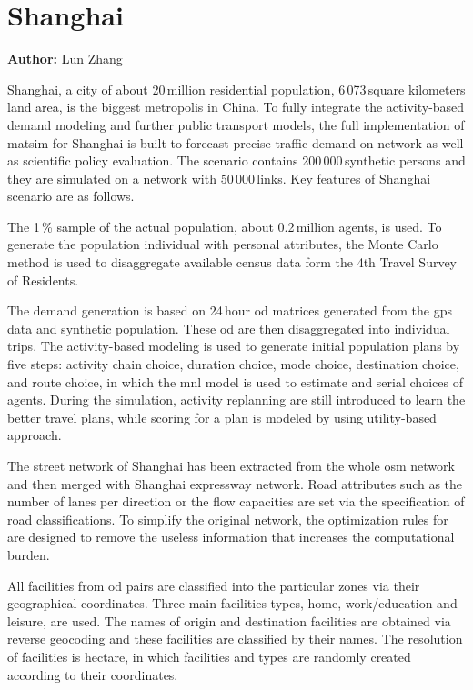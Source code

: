 \section{Shanghai}
\label{sec:shanghai}
\hfill \textbf{Author:} Lun Zhang

Shanghai, a city of about 20\,million residential population, 6\,073\,square kilometers land area, is the biggest metropolis in China. To fully integrate the activity-based demand modeling and further public transport models, the full implementation of \gls{matsim} for Shanghai is built to forecast precise traffic demand on network as well as scientific policy evaluation. The scenario contains 200\,000\,synthetic persons and they are simulated on a network with 50\,000\,links. Key features of Shanghai scenario are as follows.

The 1\,\% sample of the actual population, about 0.2\,million agents, is used. To generate the population individual with personal attributes, the Monte Carlo method is used to disaggregate available census data form the 4th Travel Survey of Residents.

The demand generation is based on 24\,hour \gls{od} matrices generated from the \gls{gps} data and synthetic population. These \gls{od} are then disaggregated into individual trips. The activity-based modeling is used to generate initial population plans by five steps: activity chain choice, duration choice, mode choice, destination choice, and route choice, in which the \gls{mnl} model is used to estimate and serial choices of agents. During the simulation, activity \gls{replanning} are still introduced to learn the better travel plans, while scoring for a plan is modeled by using utility-based approach.

The street network of Shanghai has been extracted from the whole \gls{osm} network and then merged with Shanghai expressway network. Road attributes such as the number of lanes per direction or the flow capacities are set via the specification of road classifications. To simplify the original network, the optimization rules for are designed to remove the useless information that increases the computational burden.

All facilities from \gls{od} pairs are classified into the particular zones via their geographical coordinates. Three main facilities types, home, work/education and leisure, are used. The names of origin and destination facilities are obtained via reverse \gls{geocoding} and these facilities are classified by their names. The resolution of facilities is hectare, in which facilities and types are randomly created according to their coordinates.

